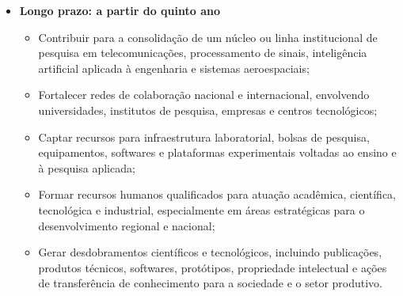 \documentclass{article}
\begin{document}
\begin{itemize}
\begin{itemize}
    \item Ampliar a orientação de estudantes de graduação e, quando possível,
    de pós-graduação, vinculando suas atividades a projetos de pesquisa,
    inovação e extensão tecnológica;

    \item Submeter projetos de maior porte a agências de fomento estaduais e
    nacionais, bem como buscar parcerias com instituições públicas, empresas,
    incubadoras, parques tecnológicos e ambientes de inovação;

    \item Estabelecer uma estação de monitoramento de cintilação ionosférica para
    caracterização de distúrbios ionosféricos e suas implicações em sistemas de
    navegação e telecomunicações via satélite, especialmente na região equatorial;

    \item Manter produção científica regular, com submissão de artigos em periódicos e congressos nacionais e internacionais nas áreas de telecomunicações, processamento de sinais, inteligência
    artificial e sistemas espaciais.
  \end{itemize}

  \item \textbf{Longo prazo: a partir do quinto ano}
  \begin{itemize}
    \item Contribuir para a consolidação de um núcleo ou linha institucional de
    pesquisa em telecomunicações, processamento de sinais, inteligência
    artificial aplicada à engenharia e sistemas aeroespaciais;

    \item Fortalecer redes de colaboração nacional e internacional, envolvendo
    universidades, institutos de pesquisa, empresas e centros tecnológicos;

    \item Captar recursos para infraestrutura laboratorial, bolsas de pesquisa,
    equipamentos, softwares e plataformas experimentais voltadas ao ensino e à
    pesquisa aplicada;

    \item Formar recursos humanos qualificados para atuação acadêmica,
    científica, tecnológica e industrial, especialmente em áreas estratégicas
    para o desenvolvimento regional e nacional;

    \item Gerar desdobramentos científicos e tecnológicos, incluindo publicações,
    produtos técnicos, softwares, protótipos, propriedade intelectual e ações de
    transferência de conhecimento para a sociedade e o setor produtivo.
  \end{itemize}
\end{itemize}
\end{document}
